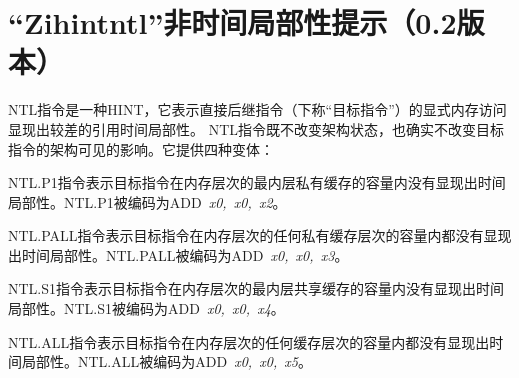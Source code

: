 \chapter{“Zihintntl”非时间局部性提示（0.2版本）}
\label{chap:zihintntl}

NTL指令是一种HINT，它表示直接后继指令（下称“目标指令”）的显式内存访问显现出较差的引用时间局部性。
NTL指令既不改变架构状态，也确实不改变目标指令的架构可见的影响。它提供四种变体：

NTL.P1指令表示目标指令在内存层次的最内层私有缓存的容量内没有显现出时间局部性。NTL.P1被编码为\mbox{ADD {\em x0, x0, x2}}。

NTL.PALL指令表示目标指令在内存层次的任何私有缓存层次的容量内都没有显现出时间局部性。NTL.PALL被编码为\mbox{ADD {\em x0, x0, x3}}。

NTL.S1指令表示目标指令在内存层次的最内层共享缓存的容量内没有显现出时间局部性。NTL.S1被编码为\mbox{ADD {\em x0, x0, x4}}。

NTL.ALL指令表示目标指令在内存层次的任何缓存层次的容量内都没有显现出时间局部性。NTL.ALL被编码为\mbox{ADD {\em x0, x0, x5}}。

